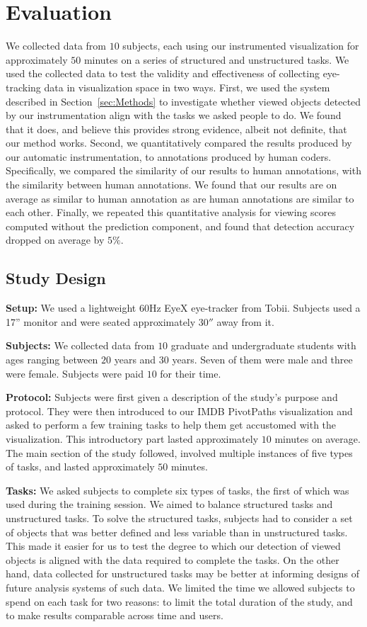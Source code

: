 \section{Evaluation}
We collected data from $10$ subjects, each using our instrumented visualization for approximately $50$ minutes on a series of structured and unstructured tasks. We used the collected data to test the validity and effectiveness of collecting eye-tracking data in visualization space in two ways. First, we used the system described in Section~\ref{sec:Methods} to investigate whether viewed objects detected by our instrumentation align with the tasks we asked people to do. We found that it does, and believe this provides strong evidence, albeit not definite, that our method works. Second, we quantitatively compared the results produced by our automatic instrumentation, to annotations produced by human coders. Specifically, we compared the similarity of our results to human annotations, with the similarity between human annotations. We found that our results are on average as similar to human annotation as are human annotations are similar to each other. Finally, we repeated this quantitative analysis for viewing scores computed without the prediction component, and found that detection accuracy dropped on average by $5\%$. 

\subsection{Study Design }

\textbf{Setup: } We used a lightweight $60$Hz EyeX eye-tracker from Tobii. Subjects used a 17'' monitor and were seated approximately $30''$ away from it.

\textbf{Subjects:} We collected data from $10$ graduate and undergraduate students with ages ranging between $20$ years and $30$ years. Seven of them were male and three were female. Subjects were paid $10$ for their time.

\textbf{Protocol:} Subjects were first given a description of the study's purpose and protocol. They were then introduced to our IMDB PivotPaths visualization and asked to perform a few training tasks to help them get accustomed with the visualization. This introductory part lasted approximately $10$ minutes on average. The main section of the study followed, involved multiple instances of five types of tasks, and lasted approximately $50$ minutes. 


\textbf{Tasks:} We asked subjects to complete six types of tasks, the first of which was used during the training session. We aimed to balance structured tasks and unstructured tasks. To solve the structured tasks, subjects had to consider a set of objects that was better defined and less variable than in unstructured tasks. This made it easier for us to test the degree to which our detection of viewed objects is aligned with the data required to complete the tasks. On the other hand, data collected for unstructured tasks may be better at informing designs of future analysis systems of such data. We limited the time we allowed subjects to spend on each task for two reasons: to limit the total duration of the study, and to make results comparable across time and users.

